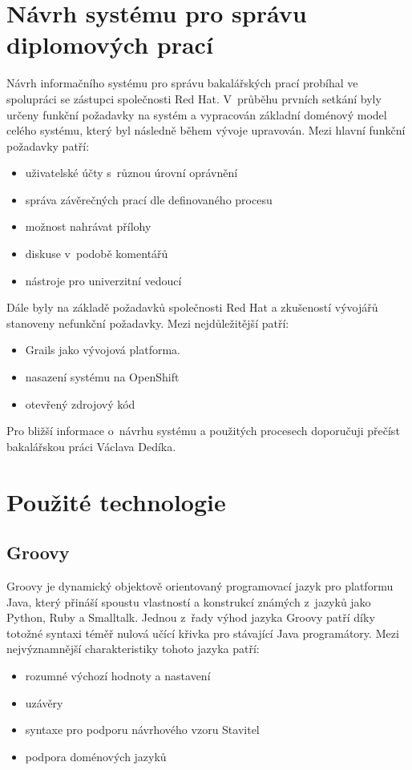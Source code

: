\section{Návrh systému pro správu diplomových prací}
Návrh informačního systému pro správu bakalářských prací probíhal ve spolupráci se zástupci společnosti Red Hat. V~průběhu prvních setkání byly určeny funkční požadavky na systém a vypracován základní doménový model celého systému, který byl následně během vývoje upravován. Mezi hlavní funkční požadavky patří:
\begin{itemize}
\item uživatelské účty s~různou úrovní oprávnění
\item správa závěrečných prací dle definovaného procesu
\item možnost nahrávat přílohy
\item diskuse v~podobě komentářů
\item nástroje pro univerzitní vedoucí
\end{itemize}


Dále byly na základě požadavků společnosti Red Hat a zkušeností vývojářů stanoveny nefunkční požadavky. Mezi nejdůležitější patří:
\begin{itemize}
\item Grails jako vývojová platforma.
\item nasazení systému na OpenShift
\item otevřený zdrojový kód
\end{itemize}


Pro bližší informace o~návrhu systému a použitých procesech doporučuji přečíst bakalářskou práci Václava Dedíka\cite{vena-bp}.

\section{Použité technologie}
\subsection{Groovy}
Groovy je dynamický objektově orientovaný programovací jazyk pro platformu Java, který přináší spoustu vlastností a konstrukcí známých z~jazyků jako Python, Ruby a Smalltalk. Jednou z~řady výhod jazyka Groovy patří díky totožné syntaxi téměř nulová učící křivka pro stávající Java programátory\cite{groovy-in-action}. Mezi nejvýznamnější charakteristiky tohoto jazyka patří\cite{groovy-homepage}:

\begin{itemize}
\item rozumné výchozí hodnoty a nastavení
\item uzávěry
\item syntaxe pro podporu návrhového vzoru Stavitel
\item podpora doménových jazyků
\end{itemize}

